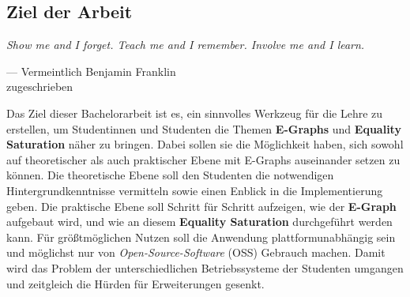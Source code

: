






\subsection{Ziel der Arbeit}

\vspace{5mm}
\begin{center}
    {\itshape
    \rmfamily
    \glqq Show me and I forget.
    Teach me and I remember. 
    Involve me and I learn.\grqq}
    \vspace{-3mm}
    \begin{flushright}
        \footnotesize
        --- Vermeintlich 
        Benjamin Franklin \\
        zugeschrieben
    \end{flushright}
\end{center}\vspace{5mm}

Das Ziel dieser Bachelorarbeit ist es, ein sinnvolles Werkzeug für die Lehre zu erstellen,
um Studentinnen und Studenten die Themen \textbf{E-Graphs} und \textbf{Equality Saturation} näher zu bringen.
Dabei sollen sie die Möglichkeit haben, sich sowohl auf theoretischer als auch praktischer Ebene mit E-Graphs auseinander setzen zu können.
Die theoretische Ebene soll den Studenten die notwendigen Hintergrundkenntnisse vermitteln sowie einen Enblick in die Implementierung geben.
Die praktische Ebene soll Schritt für Schritt aufzeigen, wie der \textbf{E-Graph} aufgebaut wird, und wie an diesem \textbf{Equality Saturation} durchgeführt werden kann.
Für grö{\ss}tmöglichen Nutzen soll die Anwendung plattformunabhängig sein und möglichst nur von \textit{Open-Source-Software} (OSS) Gebrauch machen.
Damit wird das Problem der unterschiedlichen Betriebssysteme der Studenten umgangen und zeitgleich die Hürden für Erweiterungen gesenkt.

